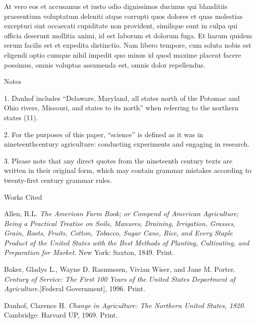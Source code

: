\documentclass[12pt]{article}
\newcommand{\bibent}{\noindent\hangindent=40pt}
\newenvironment{workscited}{\newpage\begin{center}Works Cited\end{center}}{\newpage }
\begin{document}
\begin{flushleft}
	At vero eos et accusamus et iusto odio dignissimos ducimus qui blanditiis
	praesentium voluptatum deleniti atque corrupti quos dolores et quas
	molestias excepturi sint occaecati cupiditate non provident, similique sunt
	in culpa qui officia deserunt mollitia animi, id est laborum et dolorum
	fuga. Et harum quidem rerum facilis est et expedita distinctio. Nam libero
	tempore, cum soluta nobis est eligendi optio cumque nihil impedit quo minus
	id quod maxime placeat facere possimus, omnis voluptas assumenda est, omnis
	dolor repellendus.

	\newpage

	\begin{center}
		Notes
	\end{center}

	\setlength{\parindent}{0.5in}

	1. Danhof includes ``Delaware, Maryland, all states north of the Potomac and
	Ohio rivers, Missouri, and states to its north'' when referring to the northern
	states (11).

	2. For the purposes of this paper, ``science'' is defined as it was in
	nineteenthcentury agriculture: conducting experiments and engaging in research.

	3. Please note that any direct quotes from the nineteenth century texts are
	written in their original form, which may contain grammar mistakes according to
	twenty-first century grammar rules.

	\begin{workscited}

		\bibent
		Allen, R.L. \textit{The American Farm Book; or Compend of American
			Agriculture; Being a Practical Treatise on Soils, Manures, Draining,
			Irrigation, Grasses, Grain, Roots, Fruits, Cotton, Tobacco, Sugar Cane,
			Rice, and Every Staple Product of the United States with the Best Methods
			of Planting, Cultivating, and Preparation for Market.} New York: Saxton,
		1849. Print.

		\bibent
		Baker, Gladys L., Wayne D. Rasmussen, Vivian Wiser, and Jane M. Porter.
		\textit{Century of Service: The First 100 Years of the United States
			Department of Agriculture.}[Federal Government], 1996. Print.

		\bibent
		Danhof, Clarence H. \textit{Change in Agriculture: The Northern United States,
			1820.} Cambridge: Harvard UP, 1969. Print.

	\end{workscited}

\end{flushleft}
\end{document}
